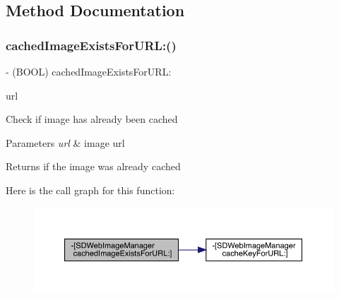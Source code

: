 \subsection{Method Documentation}
\mbox{\label{interface_s_d_web_image_manager_a9634c36e65314e0b973056a96f6a62e2}} 
\subsubsection{\texorpdfstring{cached\+Image\+Exists\+For\+U\+R\+L\+:()}{cachedImageExistsForURL:()}\hspace{0.1cm}{\footnotesize\ttfamily [1/3]}}
{\footnotesize\ttfamily -\/ (B\+O\+OL) cached\+Image\+Exists\+For\+U\+R\+L\+: \begin{DoxyParamCaption}\item[{(N\+S\+U\+RL $\ast$)}]{url }\end{DoxyParamCaption}}

Check if image has already been cached


\begin{DoxyParams}{Parameters}
{\em url} & image url\\
\hline
\end{DoxyParams}
\begin{DoxyReturn}{Returns}
if the image was already cached 
\end{DoxyReturn}
Here is the call graph for this function\+:\nopagebreak
\begin{figure}[H]
\begin{center}
\leavevmode
\includegraphics[width=350pt]{interface_s_d_web_image_manager_a9634c36e65314e0b973056a96f6a62e2_cgraph}
\end{center}
\end{figure}
\mbox{\label{interface_s_d_web_image_manager_a9634c36e65314e0b973056a96f6a62e2}} 
